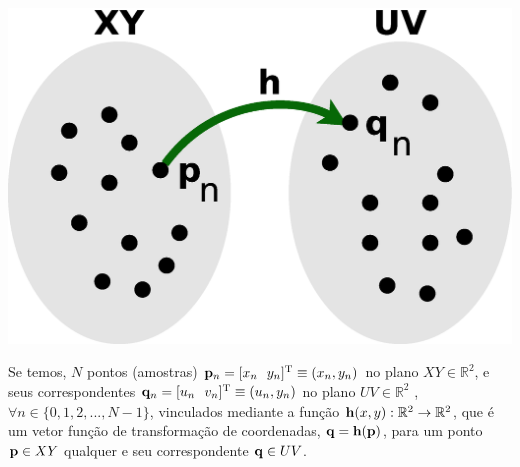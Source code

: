 \begin{theorem}
\label{theo:mapeamento}

~\\
\begin{minipage}{0.4\textwidth}
\centering
\includegraphics[width=0.8\linewidth]{chapters/inverso-mapeamento/mapeamento.eps} 
\end{minipage}
\begin{minipage}{0.6\textwidth}
\quad Se temos, $N$ pontos (amostras) $\VECTOR{p}_n=[x_n~~y_n]^{\transpose}\equiv (x_n,y_n)$ no plano $XY \in \mathbb{R}^2$, e
seus correspondentes $\VECTOR{q}_n=[u_n~~v_n]^{\transpose}\equiv (u_n,y_n)$
no plano $UV \in \mathbb{R}^2$ ,
$\forall n\in \{0, 1, 2, ..., N-1\}$, 
vinculados mediante a função $\VECTOR{h}(x,y): \mathbb{R}^2 \rightarrow \mathbb{R}^2$, 
que é um vetor função de transformação de coordenadas,
$\VECTOR{q}=\VECTOR{h}(\VECTOR{p})$, 
para um ponto $\VECTOR{p} \in XY$ qualquer e seu correspondente $\VECTOR{q} \in UV$.\\
\end{minipage}


\end{theorem}
